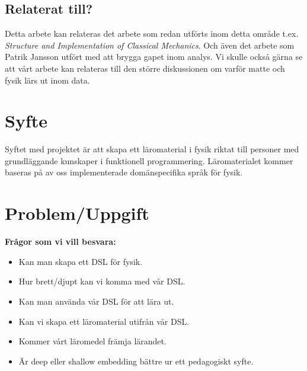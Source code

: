 \documentclass[12pt,a4paper]{scrartcl}
\begin{document}
\subsection{Relaterat till?}

Detta arbete kan relateras det arbete som redan utförts inom detta område t.ex. \textit{Structure and Implementation of Classical Mechanics}. Och även det arbete som Patrik Jansson utfört med att brygga gapet inom analys. Vi skulle också gärna se att vårt arbete kan relateras till den större diskussionen om varför matte och fysik lärs ut inom data.


\section{Syfte}

Syftet med projektet är att skapa ett läromaterial i fysik riktat till personer med grundläggande kunskaper i funktionell programmering. Läromaterialet kommer baseras på av oss implementerade domänspecifika språk för fysik.

%

\section{Problem/Uppgift}

\textbf{Frågor som vi vill besvara:}

\begin{itemize}
    \item Kan man skapa ett DSL för fysik.
    \item Hur brett/djupt kan vi komma med vår DSL.
    \item Kan man använda vår DSL för att lära ut.
    \item Kan vi skapa ett läromaterial utifrån vår DSL.
    \item Kommer vårt läromedel främja lärandet.
    \item Är deep eller shallow embedding bättre ur ett pedagogiskt syfte.
\end{itemize}
\end{document}
